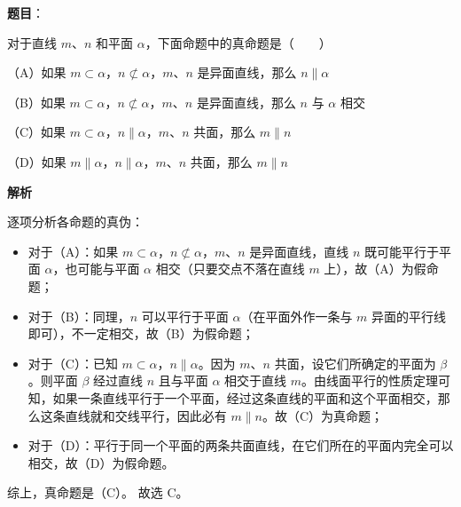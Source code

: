 \begin{answer}

\textbf{题目}：

对于直线 $m$、$n$ 和平面 $\alpha$，下面命题中的真命题是\mbox{（　　）}

（A）如果 $m\subset\alpha$，$n\not\subset\alpha$，$m$、$n$ 是异面直线，那么 $n\parallel\alpha$

（B）如果 $m\subset\alpha$，$n\not\subset\alpha$，$m$、$n$ 是异面直线，那么 $n$ 与 $\alpha$ 相交

（C）如果 $m\subset\alpha$，$n\parallel\alpha$，$m$、$n$ 共面，那么 $m\parallel n$

（D）如果 $m\parallel\alpha$，$n\parallel\alpha$，$m$、$n$ 共面，那么 $m\parallel n$

\textbf{解析}

逐项分析各命题的真伪：
\begin{itemize}
\item 对于（A）：如果 $m\subset\alpha$，$n\not\subset\alpha$，$m\text{、}n$ 是异面直线，直线 $n$ 既可能平行于平面 $\alpha$，也可能与平面 $\alpha$ 相交（只要交点不落在直线 $m$ 上），故（A）为假命题；
\item 对于（B）：同理，$n$ 可以平行于平面 $\alpha$（在平面外作一条与 $m$ 异面的平行线即可），不一定相交，故（B）为假命题；
\item 对于（C）：已知 $m\subset\alpha$，$n\parallel\alpha$。因为 $m\text{、}n$ 共面，设它们所确定的平面为 $\beta$。则平面 $\beta$ 经过直线 $n$ 且与平面 $\alpha$ 相交于直线 $m$。由线面平行的性质定理可知，如果一条直线平行于一个平面，经过这条直线的平面和这个平面相交，那么这条直线就和交线平行，因此必有 $m\parallel n$。故（C）为真命题；
\item 对于（D）：平行于同一个平面的两条共面直线，在它们所在的平面内完全可以相交，故（D）为假命题。
\end{itemize}
综上，真命题是（C）。
故选 C。


\end{answer}
